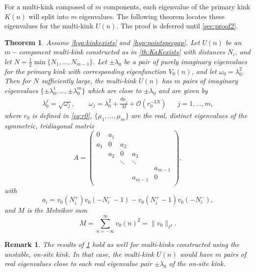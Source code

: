 \documentclass[12pt,reqno]{amsart}
\newtheorem{theorem}{Theorem}
\newtheorem{remark}{Remark}
\begin{document}
For a multi-kink composed of $m$ components, each eigenvalue of the primary kink $K(n)$ will split into $m$ eigenvalues. The following theorem locates these eigenvalues for the multi-kink $U(n)$. The proof is deferred until \cref{sec:proof2}.

\begin{theorem}\label{th:stability}
Assume \cref{hyp:kinkexists} and \cref{hyp:pointspecgap}.
Let $U(n)$ be an $m-$component multi-kink constructed as in \cref{th:KaKexists} with distances $N_i$, and let $N = \frac{1}{2} \min\{ N_1, \dots, N_{m-1}\}$. Let $\pm \lambda_0$ be a pair of purely imaginary eigenvalues for the primary kink with corresponding eigenfunction $V_0(n)$, and let $\omega_0 = \lambda_0^2$. Then for $N$ sufficiently large, the multi-kink $U(n)$ has $m$ pairs of imaginary eigenvalues $\{\pm \lambda_0^1, \dots, \pm \lambda_0^m \}$ which are close to $\pm \lambda_0$ and are given by
\begin{align}\label{eq:lambdaj}
	\lambda_0^j = \sqrt{\omega_j}, \qquad
	\omega_j = \lambda_0^2 + \frac{d \mu_j}{M} + \mathcal{O}(r_0^{-3N}) && j = 1, \dots, m,
\end{align}
where $r_0$ is defined in \cref{eq:r0}, $\{ \mu_1, \dots, \mu_m \}$ are the real, distinct eigenvalues of the symmetric, tridiagonal matrix
\begin{equation}\label{eq:matrixA}
	A = \begin{pmatrix}
	0 & a_1 & & & \\
	a_1 & 0 & a_2 \\
	& a_2 & 0 & a_3 \\
	& & \ddots & \ddots & \\
	& & & & a_{m-1}  \\
	& & & a_{m-1} & 0  \\
	\end{pmatrix},
\end{equation}
with 
\begin{equation}\label{eq:ai}
	a_i = v_0(N_i^+)v_0(-N_i^- - 1) - v_0(N_i^+ - 1)v_0(-N_i^-),
\end{equation}
and $M$ is the Melnikov sum
\begin{equation}\label{eq:Minth}
	M = \sum_{n = -\infty}^{\infty} v_0(n)^2 = \| v_0 \|_{\ell^2}.
	\end{equation}
\end{theorem}

\begin{remark}\label{remark:unstablekink}
	The results of \cref{th:stability} hold as well for multi-kinks constructed using the unstable, on-site kink. In that case, the multi-kink $U(n)$ would have $m$ pairs of real eigenvalues close to each real eigenvalue pair $\pm \lambda_0$ of the on-site kink.
\end{remark}
\end{document}
